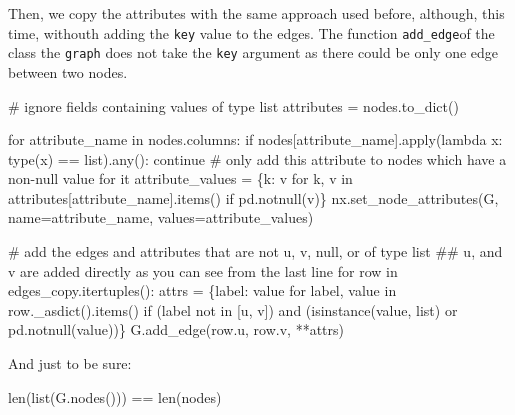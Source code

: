 \documentclass[
  letterpaper,
  DIV=11,
  numbers=noendperiod]{scrreprt}
\newenvironment{Shaded}{\begin{snugshade}}{\end{snugshade}}
\newcommand{\BuiltInTok}[1]{\textcolor[rgb]{0.00,0.23,0.31}{#1}}
\newcommand{\CommentTok}[1]{\textcolor[rgb]{0.37,0.37,0.37}{#1}}
\newcommand{\ControlFlowTok}[1]{\textcolor[rgb]{0.00,0.23,0.31}{#1}}
\newcommand{\KeywordTok}[1]{\textcolor[rgb]{0.00,0.23,0.31}{#1}}
\newcommand{\NormalTok}[1]{\textcolor[rgb]{0.00,0.23,0.31}{#1}}
\newcommand{\OperatorTok}[1]{\textcolor[rgb]{0.37,0.37,0.37}{#1}}
\newcommand{\StringTok}[1]{\textcolor[rgb]{0.13,0.47,0.30}{#1}}
\begin{document}
Then, we copy the attributes with the same approach used before,
although, this time, withouth adding the \texttt{key} value to the
edges. The function \texttt{add\_edge}of the class the \texttt{graph}
does not take the \texttt{key} argument as there could be only one edge
between two nodes.

\begin{Shaded}
\begin{Highlighting}[]
\CommentTok{\# ignore fields containing values of type list}
\NormalTok{attributes }\OperatorTok{=}\NormalTok{ nodes.to\_dict()}

\ControlFlowTok{for}\NormalTok{ attribute\_name }\KeywordTok{in}\NormalTok{ nodes.columns:}
    \ControlFlowTok{if}\NormalTok{ nodes[attribute\_name].}\BuiltInTok{apply}\NormalTok{(}\KeywordTok{lambda}\NormalTok{ x: }\BuiltInTok{type}\NormalTok{(x) }\OperatorTok{==} \BuiltInTok{list}\NormalTok{).}\BuiltInTok{any}\NormalTok{(): }
        \ControlFlowTok{continue}    
    \CommentTok{\# only add this attribute to nodes which have a non{-}null value for it}
\NormalTok{    attribute\_values }\OperatorTok{=}\NormalTok{ \{k: v }\ControlFlowTok{for}\NormalTok{ k, v }\KeywordTok{in}\NormalTok{ attributes[attribute\_name].items() }\ControlFlowTok{if}\NormalTok{ pd.notnull(v)\}}
\NormalTok{    nx.set\_node\_attributes(G, name}\OperatorTok{=}\NormalTok{attribute\_name, values}\OperatorTok{=}\NormalTok{attribute\_values)}

\CommentTok{\# add the edges and attributes that are not u, v, null, or of type list}
\CommentTok{\#\# u, and v are added directly as you can see from the last line}
\ControlFlowTok{for}\NormalTok{ row }\KeywordTok{in}\NormalTok{ edges\_copy.itertuples():}
\NormalTok{    attrs }\OperatorTok{=}\NormalTok{ \{label: value }\ControlFlowTok{for}\NormalTok{ label, value }\KeywordTok{in}\NormalTok{ row.\_asdict().items() }\ControlFlowTok{if}\NormalTok{ (label }\KeywordTok{not} \KeywordTok{in}\NormalTok{ [}\StringTok{\textquotesingle{}u\textquotesingle{}}\NormalTok{, }\StringTok{\textquotesingle{}v\textquotesingle{}}\NormalTok{]) }\KeywordTok{and}\NormalTok{ (}\BuiltInTok{isinstance}\NormalTok{(value, }\BuiltInTok{list}\NormalTok{) }\KeywordTok{or}\NormalTok{ pd.notnull(value))\}}
\NormalTok{    G.add\_edge(row.u, row.v, }\OperatorTok{**}\NormalTok{attrs)}
\end{Highlighting}
\end{Shaded}

And just to be sure:

\begin{Shaded}
\begin{Highlighting}[]
\BuiltInTok{len}\NormalTok{(}\BuiltInTok{list}\NormalTok{(G.nodes())) }\OperatorTok{==} \BuiltInTok{len}\NormalTok{(nodes)}
\end{Highlighting}
\end{Shaded}
\end{document}
